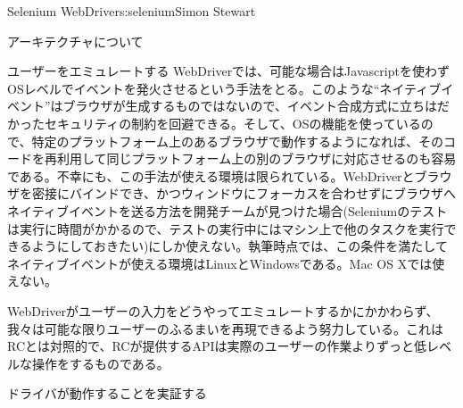 \begin{aosachapter}{Selenium WebDriver}{s:selenium}{Simon Stewart}
\begin{aosasect1}{アーキテクチャについて}
\begin{aosasect2}{ユーザーをエミュレートする}
WebDriverでは、可能な場合はJavascriptを使わずOSレベルでイベントを発火させるという手法をとる。このような``ネイティブイベント''はブラウザが生成するものではないので、イベント合成方式に立ちはだかったセキュリティの制約を回避できる。そして、OSの機能を使っているので、特定のプラットフォーム上のあるブラウザで動作するようになれば、そのコードを再利用して同じプラットフォーム上の別のブラウザに対応させるのも容易である。不幸にも、この手法が使える環境は限られている。WebDriverとブラウザを密接にバインドでき、かつウィンドウにフォーカスを合わせずにブラウザへネイティブイベントを送る方法を開発チームが見つけた場合(Seleniumのテストは実行に時間がかかるので、テストの実行中にはマシン上で他のタスクを実行できるようにしておきたい)にしか使えない。執筆時点では、この条件を満たしてネイティブイベントが使える環境はLinuxとWindowsである。Mac OS Xでは使えない。

WebDriverがユーザーの入力をどうやってエミュレートするかにかかわらず、我々は可能な限りユーザーのふるまいを再現できるよう努力している。これはRCとは対照的で、RCが提供するAPIは実際のユーザーの作業よりずっと低レベルな操作をするものである。

\end{aosasect2}

\begin{aosasect2}{ドライバが動作することを実証する}


\end{aosasect2}
\end{aosasect1}
\end{aosachapter}
